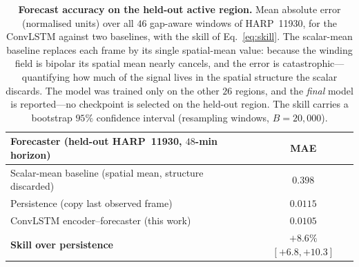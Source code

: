 \begin{table}[!htbp]
\centering
\caption[Forecast results]{\textbf{Forecast accuracy on the held-out active
region.} Mean absolute error (normalised units) over all $46$ gap-aware windows
of HARP~11930, for the ConvLSTM against two baselines, with the skill of
Eq.~\eqref{eq:skill}. The scalar-mean baseline replaces each frame by its single
spatial-mean value: because the winding field is bipolar its spatial mean nearly
cancels, and the error is catastrophic---quantifying how much of the signal lives
in the spatial structure the scalar discards. The model was trained only on the
other $26$ regions, and the \emph{final} model is reported---no checkpoint is
selected on the held-out region. The skill carries a bootstrap $95\%$ confidence
interval (resampling windows, $B=20{,}000$).}
\label{tab:results}
\renewcommand{\arraystretch}{1.25}
\begin{tabular}{|l|c|}
\hline
Forecaster (held-out HARP~11930, $48$-min horizon) & MAE \\
\hline\hline
Scalar-mean baseline (spatial mean, structure discarded) & $0.398$ \\ \hline
Persistence (copy last observed frame)             & $0.0115$ \\ \hline
ConvLSTM encoder--forecaster (this work)           & $\mathbf{0.0105}$ \\
\hline\hline
\textbf{Skill over persistence} & $\mathbf{+8.6\%}$ \small$[+6.8,+10.3]$ \\
\hline
\end{tabular}
\end{table}
